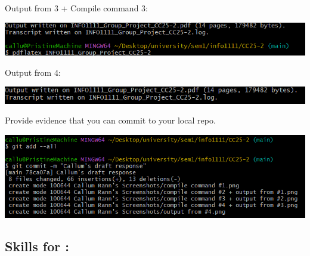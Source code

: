 \documentclass[a4paper, 11pt]{report}
\begin{document}
Output from 3 + Compile command 3:

\includegraphics{Callum - compile command 4 + output from 3}


Output from 4:

\includegraphics{Callum - output from 4}

Provide evidence that you can commit to your local repo.

\includegraphics{Callum - local pushing guide}

\subsection{Skills for \majB: \studB}
\end{document}

